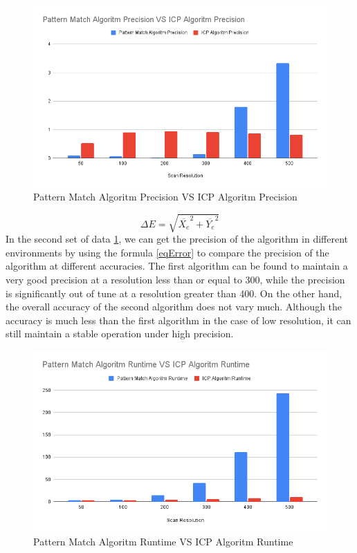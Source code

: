 \documentclass[conference]{IEEEtran}
\begin{document}
\begin{figure}[htbp]
\centerline{\includegraphics[width=\linewidth]{../result/Pattern_Match_Algoritm_Precision_VS_ICP_Algoritm_Precision.png}}
\caption{Pattern Match Algoritm Precision VS ICP Algoritm Precision}
\label{PrecisionFig}
\end{figure}

\begin{equation}
\Delta E = \sqrt{\overline{X_e}^2 + \overline{Y_e}^2}\label{eqError}
\end{equation}
In the second set of data \ref{PrecisionFig}, we can get the precision of the algorithm in different environments by using the formula \eqref{eqError} to compare the precision of the algorithm at different accuracies. The first algorithm can be found to maintain a very good precision at a resolution less than or equal to 300, while the precision is significantly out of tune at a resolution greater than 400. On the other hand, the overall accuracy of the second algorithm does not vary much. Although the accuracy is much less than the first algorithm in the case of low resolution, it can still maintain a stable operation under high precision.

\begin{figure}[htbp]
\centerline{\includegraphics[width=\linewidth]{../result/Pattern_Match_Algoritm_Runtime_VS_ICP_Algoritm_Runtime.png}}
\caption{Pattern Match Algoritm Runtime VS ICP Algoritm Runtime}
\label{RuntimeFig}
\end{figure}
\end{document}
